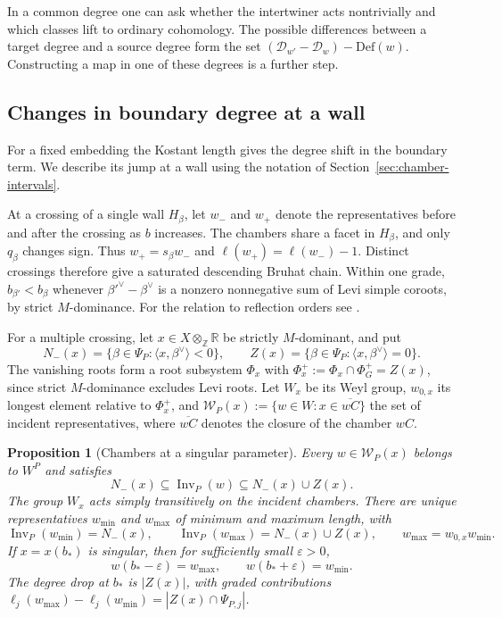 \documentclass[12pt]{amsart}
\numberwithin{equation}{section}
\theoremstyle{plain}
\newtheorem{proposition}[theorem]{Proposition}
\theoremstyle{definition}
\theoremstyle{remark}
\DeclareMathOperator{\Inv}{Inv}
\newcommand{\Def}{\mathrm{Def}}
\begin{document}
In a common degree one can ask whether the intertwiner acts nontrivially and which classes lift to ordinary cohomology. The possible differences between a target degree and a source degree form the set
\((\mathcal D_{w'}-\mathcal D_w)-\Def(w)\).
Constructing a map in one of these degrees is a further step.

\subsection{Changes in boundary degree at a wall}
For a fixed embedding the Kostant length gives the degree shift in the boundary term. We describe its jump at a wall using the notation of Section~\ref{sec:chamber-intervals}.

At a crossing of a single wall $H_\beta$, let $w_-$ and $w_+$ denote the representatives before and after the crossing as $b$ increases. The chambers share a facet in $H_\beta$, and only $q_\beta$ changes sign. Thus $w_+=s_\beta w_-$ and $\ell(w_+)=\ell(w_-)-1$. Distinct crossings therefore give a saturated descending Bruhat chain. Within one grade, $b_{\beta'}<b_\beta$ whenever $\beta'^\vee-\beta^\vee$ is a nonzero nonnegative sum of Levi simple coroots, by strict $M$-dominance. For the relation to reflection orders see \cite[\S2]{Dyer1993}.

For a multiple crossing, let $x\in X\otimes_{\mathbb Z}\mathbb R$ be strictly $M$-dominant, and put 
\[
 N_-(x)=\{\beta\in\Psi_P:\langle x,\beta^\vee\rangle<0\},\qquad
 Z(x)=\{\beta\in\Psi_P:\langle x,\beta^\vee\rangle=0\}.
\]
The vanishing roots form a root subsystem $\Phi_x$ with $\Phi_x^+:=\Phi_x\cap\Phi_G^+=Z(x)$, since strict $M$-dominance excludes Levi roots. Let $W_x$ be its Weyl group, $w_{0,x}$ its longest element relative to $\Phi_x^+$, and $\mathcal W_P(x):=\{w\in W:x\in\overline{wC}\}$ the set of incident representatives, where $\overline{wC}$ denotes the closure of the chamber $wC$.

\begin{proposition}[Chambers at a singular parameter]\label{prop:face}
Every $w\in\mathcal W_P(x)$ belongs to $W^P$ and satisfies 
\[
 N_-(x)\subseteq\Inv_P(w)\subseteq N_-(x)\cup Z(x).
\]
The group $W_x$ acts simply transitively on the incident chambers. There are unique representatives $w_{\min}$ and $w_{\max}$ of minimum and maximum length, with 
\[
 \Inv_P(w_{\min})=N_-(x),\qquad
 \Inv_P(w_{\max})=N_-(x)\cup Z(x),\qquad
 w_{\max}=w_{0,x}w_{\min}.
\]
If $x=x(b_*)$ is singular, then for sufficiently small $\varepsilon>0$, 
\[
 w(b_*-\varepsilon)=w_{\max},\qquad
 w(b_*+\varepsilon)=w_{\min}.
\]
The degree drop at $b_*$ is $|Z(x)|$, with graded contributions $\ell_j(w_{\max})-\ell_j(w_{\min})=|Z(x)\cap\Psi_{P,j}|$. 
\end{proposition}
\end{document}
